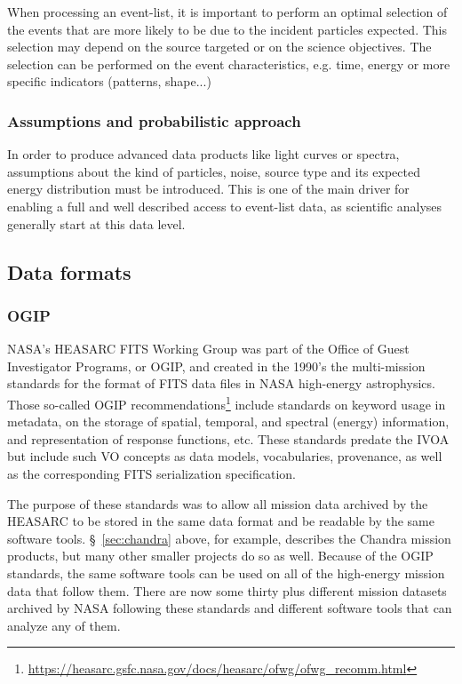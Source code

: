 \documentclass[11pt,a4paper]{ivoa}
\begin{document}
When processing an event-list, it is important to perform an optimal {selection of the events} that are more likely to be due to the incident particles expected. This selection may depend on the source targeted or on the science objectives. The selection can be performed on the event characteristics, e.g. time, energy or more specific indicators (patterns, shape...)


\subsubsection{Assumptions and probabilistic approach}

In order to produce advanced data products like light curves or spectra, {assumptions} about the kind of particles, noise, source type and its expected energy distribution must be introduced. This is one of the main driver for enabling a full and well described access to event-list data, as scientific analyses generally start at this data level.


\subsection{Data formats}
\label{sec:data_formats}

\subsubsection{{OGIP}}\label{sec:ogip}

NASA's HEASARC FITS Working Group was part of the Office of Guest Investigator Programs, or OGIP, and created in the 1990's the multi-mission standards for the format of FITS data files in NASA high-energy astrophysics. Those so-called OGIP  recommendations\footnote{\url{https://heasarc.gsfc.nasa.gov/docs/heasarc/ofwg/ofwg_recomm.html}} include standards on keyword usage in metadata, on the storage of spatial, temporal, and spectral (energy) information, and representation of response functions, etc.  These standards predate the IVOA but include such VO concepts as data models, vocabularies, provenance, as well as the corresponding FITS serialization specification.   

The purpose of these standards was to allow all mission data archived by the HEASARC to be stored in the same data format and be readable by the same software tools. \S~\ref{sec:chandra} above, for example, describes the Chandra mission products, but many other smaller projects do so as well.  Because of the OGIP standards, the same software tools can be used on all of the high-energy mission data that follow them.  There are now some thirty plus different mission datasets archived by NASA following these standards and different software tools that can analyze any of them.  
\end{document}
